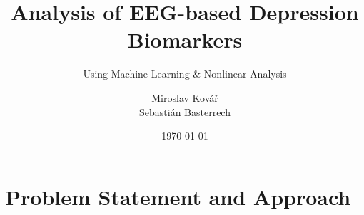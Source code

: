 \documentclass{beamer}
\title{Analysis of EEG-based Depression Biomarkers}
\subtitle{Using Machine Learning \& Nonlinear Analysis}
\author{Miroslav Kovář\\[1mm]\small{Sebastián Basterrech}}
\institute{FJFI}
\date{\today}
\begin{document}

\begin{frame}
	\maketitle %
\end{frame}


\section{Problem Statement and Approach} 
\end{document}
